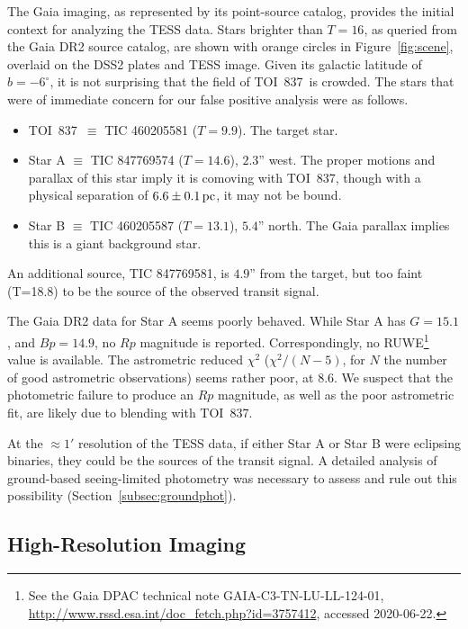 \documentclass[12pt,twocolumn,tighten]{aastex62}
\newcommand{\tn}{TOI~837} %
\begin{document}
The Gaia imaging, as represented by its point-source catalog, provides
the initial context for analyzing the TESS data.  Stars brighter than
$T=16$, as queried from the Gaia DR2 source catalog, are shown with
orange circles in Figure~\ref{fig:scene}, overlaid on the DSS2 plates
and TESS image.  Given its galactic latitude of $b=-6^\circ$, it is
not surprising that the field of \tn\ is crowded.  The stars that were
of immediate concern for our false positive analysis were as follows.
\begin{itemize}
  \item \tn\ $\equiv$ TIC 460205581 ($T=9.9$). The target star.
  \item Star A $\equiv$ TIC 847769574 ($T=14.6$), $2.3$'' west. The
    proper motions and parallax of this star imply it is comoving with
    \tn, though with a physical separation of $6.6\pm 0.1\,{\rm pc}$,
    it may not be bound.
  \item Star B $\equiv$ TIC 460205587 ($T=13.1$), $5.4$'' north.  The
    Gaia parallax implies this is a giant background star.
\end{itemize}
An additional source, TIC 847769581, is $4.9$'' from the target, but
too faint (T=18.8) to be the source of the observed transit signal.

The Gaia DR2 data for Star A seems poorly behaved.  While
Star A has $G=15.1$, and $Bp=14.9$, no $Rp$ magnitude is reported.
Correspondingly, no RUWE\footnote{ See the Gaia
DPAC technical note GAIA-C3-TN-LU-LL-124-01,
\url{http://www.rssd.esa.int/doc_fetch.php?id=3757412}, accessed
2020-06-22. } value is available.  The astrometric
reduced $\chi^2$ ($\chi^2 / (N-5)$, for $N$ the number of good
astrometric observations) seems rather poor, at $8.6$.  We suspect
that the photometric failure to produce an $Rp$ magnitude, as well as
the poor astrometric fit, are likely due to blending with \tn.

At the $\approx1'$ resolution of the TESS data, if either Star A
or Star B were eclipsing binaries, they could be the sources of the
transit signal.  A detailed analysis of ground-based seeing-limited
photometry was necessary to assess and rule out this possibility
(Section~\ref{subsec:groundphot}).


\subsection{High-Resolution Imaging}
\label{subsec:speckle}
\end{document}
